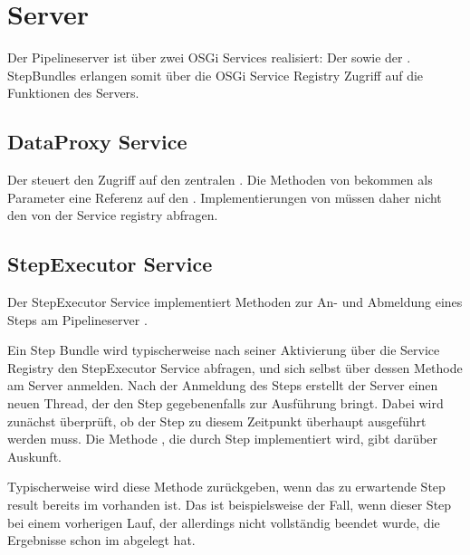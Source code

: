 \section{Server}
Der Pipelineserver  ist über zwei OSGi Services realisiert:
Der  sowie der .
StepBundles  erlangen somit über die OSGi Service Registry
Zugriff auf die Funktionen des Servers.

\subsection{DataProxy Service}
Der  steuert den Zugriff auf den zentralen
.
Die Methoden von  bekommen als Parameter eine Referenz auf den
.
Implementierungen von  müssen daher nicht den  von der Service registry abfragen.

\subsection{StepExecutor Service}
Der StepExecutor Service implementiert Methoden zur An- und Abmeldung eines
Steps am Pipelineserver .

Ein Step Bundle  wird typischerweise nach seiner Aktivierung über
die Service Registry den StepExecutor Service abfragen, und sich selbst über
dessen  Methode am Server anmelden.
Nach der Anmeldung des Steps erstellt der Server einen neuen Thread, der den
Step gegebenenfalls zur Ausführung bringt.
Dabei wird zunächst überprüft, ob der Step zu diesem Zeitpunkt überhaupt
ausgeführt werden muss.
Die Methode , die durch Step implementiert wird, gibt
darüber Auskunft. 

Typischerweise wird diese Methode  zurückgeben, wenn das zu
erwartende Step result  bereits im  vorhanden ist.
Das ist beispielsweise der Fall, wenn dieser Step bei einem vorherigen Lauf,
der allerdings nicht vollständig beendet wurde, die Ergebnisse schon im
 abgelegt hat.

